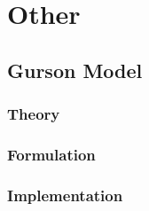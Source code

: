 \chapter{Other}
\section{Gurson Model}
\subsection{Theory}
\subsection{Formulation}
\subsection{Implementation}
